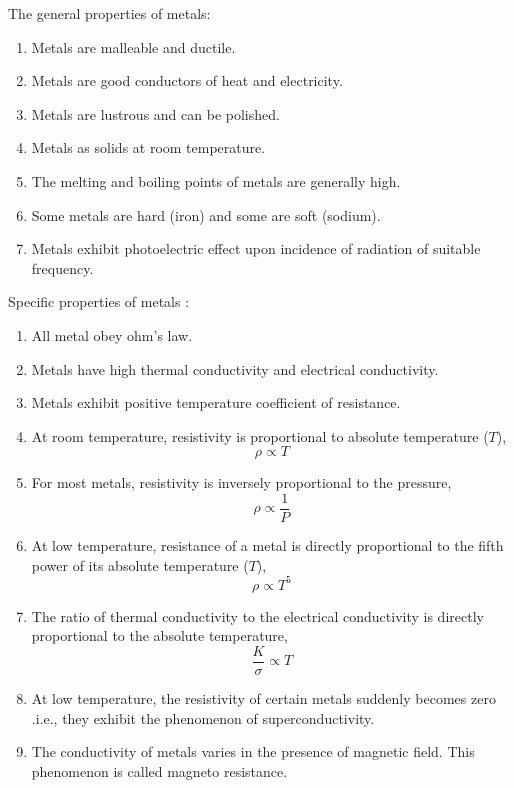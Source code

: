 \documentclass[15pt]{article}
\begin{document}
The general properties of metals:
\begin{enumerate}
    \item Metals are malleable and ductile.
    \item Metals are good conductors of heat and electricity.
    \item Metals are lustrous and can be polished.
    \item Metals as solids at room temperature.
    \item The melting and boiling points of metals are generally high.
    \item Some metals are hard (iron) and some are soft (sodium).
    \item Metals exhibit photoelectric effect upon incidence of radiation of suitable frequency.
\end{enumerate}
Specific properties of metals \footnotemark{}:
\begin{enumerate}
    \item All metal obey ohm's law.
    \item Metals have high thermal conductivity and electrical conductivity.
    \item Metals exhibit positive temperature coefficient of resistance.
    \item At room temperature, resistivity is proportional to absolute temperature ($T$),
        \begin{equation*}
            \rho \propto T
        \end{equation*}
    \item For most metals, resistivity is inversely proportional to the pressure,
        \begin{equation*}
            \rho \propto \frac{1}{P}
        \end{equation*}
    \item At low temperature, resistance of a metal is directly proportional to the fifth power of its absolute temperature ($T$),
        \begin{equation*}
            \rho \propto T^{5}
        \end{equation*}


     \item  The ratio of thermal conductivity to the electrical conductivity is directly proportional to the absolute temperature,
        \begin{equation*}
            \frac{K}{\sigma} \propto T
        \end{equation*}
    \item At low temperature, the resistivity of certain metals suddenly becomes zero .i.e., they exhibit the phenomenon of superconductivity.
    \item The conductivity of metals varies in the presence of magnetic field. This phenomenon is called magneto resistance.
      
\end{enumerate}
\end{document}
